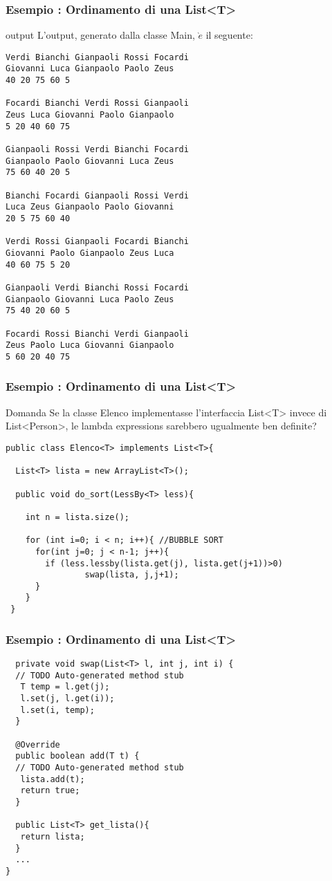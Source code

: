 \documentclass{beamer}
\begin{document}
\begin{frame}[fragile]
\frametitle{Esempio : Ordinamento di una List<T>}
\begin{beamercolorbox}{output}
L'output, generato dalla classe Main, $\grave{e}$ il seguente:
\end{beamercolorbox}
\fontsize{9pt}{7.2}\selectfont
\begin{verbatim}
Verdi Bianchi Gianpaoli Rossi Focardi 
Giovanni Luca Gianpaolo Paolo Zeus 
40 20 75 60 5 

Focardi Bianchi Verdi Rossi Gianpaoli 
Zeus Luca Giovanni Paolo Gianpaolo 
5 20 40 60 75 

Gianpaoli Rossi Verdi Bianchi Focardi 
Gianpaolo Paolo Giovanni Luca Zeus 
75 60 40 20 5 

Bianchi Focardi Gianpaoli Rossi Verdi 
Luca Zeus Gianpaolo Paolo Giovanni 
20 5 75 60 40 

Verdi Rossi Gianpaoli Focardi Bianchi 
Giovanni Paolo Gianpaolo Zeus Luca 
40 60 75 5 20 

Gianpaoli Verdi Bianchi Rossi Focardi 
Gianpaolo Giovanni Luca Paolo Zeus 
75 40 20 60 5 

Focardi Rossi Bianchi Verdi Gianpaoli 
Zeus Paolo Luca Giovanni Gianpaolo 
5 60 20 40 75 

\end{verbatim}
\end{frame}

\begin{frame}[fragile]
\frametitle{Esempio : Ordinamento di una List<T>}
\begin{block}{Domanda}
Se la classe Elenco implementasse l'interfaccia List<T> invece di List<Person>, le lambda expressions sarebbero ugualmente ben definite?
\end{block}
\pause
\begin{lstlisting}
public class Elenco<T> implements List<T>{

  List<T> lista = new ArrayList<T>();
	
  public void do_sort(LessBy<T> less){
		
    int n = lista.size();
		
    for (int i=0; i < n; i++){ //BUBBLE SORT
      for(int j=0; j < n-1; j++){
        if (less.lessby(lista.get(j), lista.get(j+1))>0)
                swap(lista, j,j+1);
      }
    }
 }
\end{lstlisting}
\end{frame}

\begin{frame}[fragile]
\frametitle{Esempio : Ordinamento di una List<T>}
\begin{lstlisting}
  private void swap(List<T> l, int j, int i) {
  // TODO Auto-generated method stub
   T temp = l.get(j);
   l.set(j, l.get(i));
   l.set(i, temp);
  }
  
  @Override
  public boolean add(T t) {
  // TODO Auto-generated method stub
   lista.add(t);
   return true;
  }
  
  public List<T> get_lista(){
   return lista;
  }
  ...
}
\end{lstlisting}
\end{frame}
\end{document}
